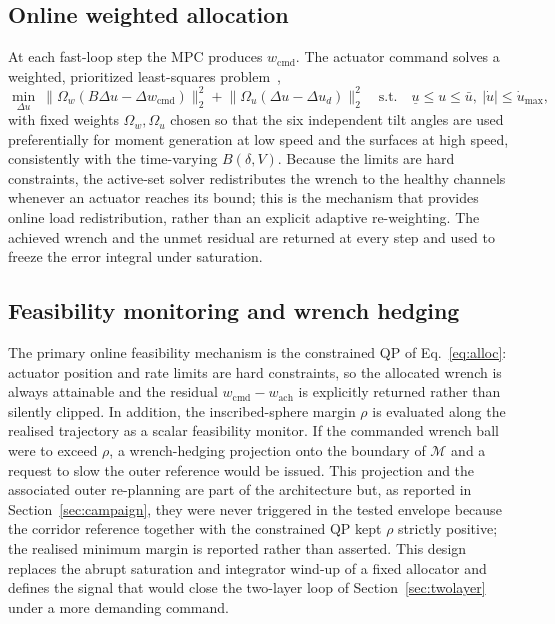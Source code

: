 \documentclass[preprint,3p,11pt]{elsarticle}
\begin{document}
\subsection{Online weighted allocation}\label{sec:alloc}
At each fast-loop step the MPC produces $w_{\mathrm{cmd}}$. The actuator
command solves a weighted, prioritized least-squares
problem~\cite{johansen2013survey,blaha2023survey,tohidi2020adaptive},
\begin{equation}
\min_{\Delta u}\ \bigl\|\Omega_w(B\Delta u-\Delta w_{\mathrm{cmd}})\bigr\|_2^2
 +\bigl\|\Omega_u(\Delta u-\Delta u_d)\bigr\|_2^2
\quad\text{s.t.}\quad \underline u\le u\le\bar u,\ |\dot u|\le\dot u_{\max},
\label{eq:alloc}
\end{equation}
with fixed weights $\Omega_w,\Omega_u$ chosen so that the six independent tilt
angles are used preferentially for moment generation at low speed and the
surfaces at high speed, consistently with the time-varying $B(\delta,V)$.
Because the limits are hard constraints, the active-set solver redistributes
the wrench to the healthy channels whenever an actuator reaches its bound;
this is the mechanism that provides online load redistribution, rather than an
explicit adaptive re-weighting. The achieved wrench and the unmet residual are
returned at every step and used to freeze the error integral under
saturation.

\subsection{Feasibility monitoring and wrench hedging}\label{sec:hedge}
The primary online feasibility mechanism is the constrained QP of
Eq.~\eqref{eq:alloc}: actuator position and rate limits are hard constraints,
so the allocated wrench is always attainable and the residual
$w_{\mathrm{cmd}}-w_{\mathrm{ach}}$ is explicitly returned rather than silently
clipped. In addition, the inscribed-sphere margin $\rho$ is evaluated along the
realised trajectory as a scalar feasibility monitor. If the commanded wrench
ball were to exceed $\rho$, a wrench-hedging projection onto the boundary of
$\mathcal{M}$ and a request to slow the outer reference would be issued. This
projection and the associated outer re-planning are part of the architecture
but, as reported in Section~\ref{sec:campaign}, they were never triggered in
the tested envelope because the corridor reference together with the
constrained QP kept $\rho$ strictly positive; the realised minimum margin is
reported rather than asserted. This design replaces the abrupt saturation and
integrator wind-up of a fixed allocator and defines the signal that would
close the two-layer loop of Section~\ref{sec:twolayer} under a more demanding
command.
\end{document}
